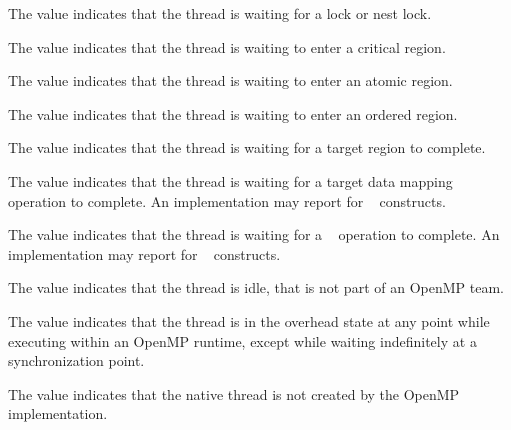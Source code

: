 The value  indicates that the thread is waiting 
for a  lock or nest lock. 

The value  indicates that the thread is 
waiting to enter a critical region. 

The value  indicates that the thread is 
waiting to enter an atomic region. 

The value  indicates that the thread is 
waiting to enter an ordered region. 

The value  indicates that the thread is 
waiting for a target region to complete.

The value  indicates that the thread is 
waiting for a target data mapping operation to complete. An implementation may 
report  for ~ constructs.

The value  indicates that the thread is 
waiting for a ~ operation to complete. An implementation 
may report  for ~ constructs.

The value  indicates that the thread is idle, that 
is not part of an OpenMP team.

The value  indicates that the thread is in the 
overhead state at any point while executing within an OpenMP runtime, 
except while waiting indefinitely at a synchronization point.

The value  indicates that the native thread is 
not created by the OpenMP implementation.

